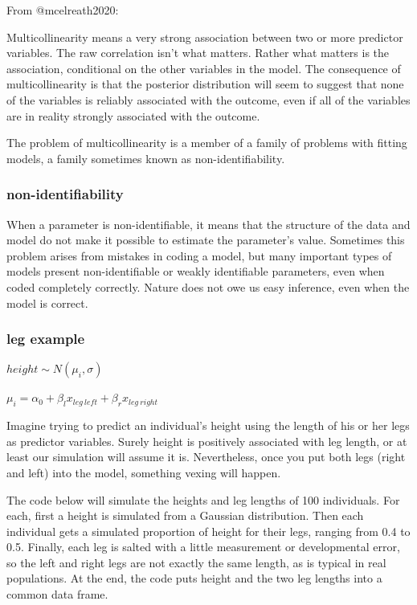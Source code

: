 \documentclass[
]{article}
\begin{document}
From @mcelreath2020:

Multicollinearity means a very strong association between two or more
predictor variables. The raw correlation isn't what matters. Rather what
matters is the association, conditional on the other variables in the
model. The consequence of multicollinearity is that the posterior
distribution will seem to suggest that none of the variables is reliably
associated with the outcome, even if all of the variables are in reality
strongly associated with the outcome.

The problem of multicollinearity is a member of a family of problems
with fitting models, a family sometimes known as non-identifiability.

\hypertarget{non-identifiability}{%
\subsubsection{\texorpdfstring{\textbf{non-identifiability}}{non-identifiability}}\label{non-identifiability}}

When a parameter is non-identifiable, it means that the structure of the
data and model do not make it possible to estimate the parameter's
value. Sometimes this problem arises from mistakes in coding a model,
but many important types of models present non-identifiable or weakly
identifiable parameters, even when coded completely correctly. Nature
does not owe us easy inference, even when the model is correct.

\hypertarget{leg-example}{%
\subsubsection{leg example}\label{leg-example}}

\(height \sim N(\mu_i, \sigma)\)

\(\mu_i = \alpha_{0} + \beta_{l} x_{leg\:left}+ \beta_{r} x_{leg\:right}\)

Imagine trying to predict an individual's height using the length of his
or her legs as predictor variables. Surely height is positively
associated with leg length, or at least our simulation will assume it
is. Nevertheless, once you put both legs (right and left) into the
model, something vexing will happen.

The code below will simulate the heights and leg lengths of 100
individuals. For each, first a height is simulated from a Gaussian
distribution. Then each individual gets a simulated proportion of height
for their legs, ranging from 0.4 to 0.5. Finally, each leg is salted
with a little measurement or developmental error, so the left and right
legs are not exactly the same length, as is typical in real populations.
At the end, the code puts height and the two leg lengths into a common
data frame.
\end{document}
